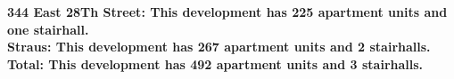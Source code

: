 \bf{344 East 28Th Street}: This development has 225 apartment units and one stairhall.\\\bf{Straus}: This development has 267 apartment units and 2 stairhalls.\\\bf{Total}: This development has 492 apartment units and 3 stairhalls.\\